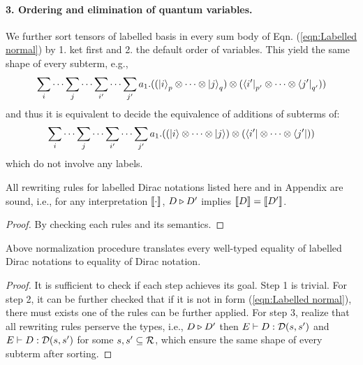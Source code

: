 \paragraph*{3. Ordering and elimination of quantum variables.} 
We further sort tensors of labelled basis in every sum body of Eqn. (\ref{eqn:Labelled normal}) by 1. ket first and 2. the default order of variables. This yield the same shape of every subterm, e.g., 
\begin{equation*}
  \sum_{i}\cdots\sum_{j}\cdots \sum_{i'}\cdots\sum_{j'} a_1 . ((\ket{i}_p \otimes \cdots \otimes \ket{j}_q) \otimes (\bra{i'}_{p'}\otimes\cdots\otimes \bra{j'}_{q'}))
\end{equation*}
and thus it is equivalent to decide the equivalence of additions of subterms of:
\begin{equation}
  \label{eqn:Labelled normal1}
  \sum_{i}\cdots\sum_{j}\cdots \sum_{i'}\cdots\sum_{j'} a_1 . ((\ket{i} \otimes \cdots \otimes \ket{j}) \otimes (\bra{i'}\otimes\cdots\otimes \bra{j'}))
\end{equation}
which do not involve any labels.

\begin{theorem}[Soundness]
  All rewriting rules for labelled Dirac notations listed here and in Appendix are sound, i.e., for any interpretation ${\llbracket \cdot \rrbracket}$, $D\triangleright D'$ implies ${\llbracket D \rrbracket} = {\llbracket D' \rrbracket}$.
\end{theorem}
\begin{proof}
  By checking each rules and its semantics.
\end{proof}

\begin{theorem}
  Above normalization procedure translates every well-typed equality of labelled Dirac notations to equality of Dirac notation.
\end{theorem}
\begin{proof}
  It is sufficient to check if each step achieves its goal. Step 1 is trivial. For step 2, it can be further checked that if it is not in form (\ref{eqn:Labelled normal}), there must exists one of the rules can be further applied.
  For step 3, realize that all rewriting rules perserve the types, i.e., $D\triangleright D'$ then $E\vdash D : {\mathcal{D}}(s,s')$ and $E\vdash D : {\mathcal{D}}(s,s')$ for some $s,s'\subseteq \mathcal{R}$, which ensure the same shape of every subterm after sorting. 
\end{proof}

